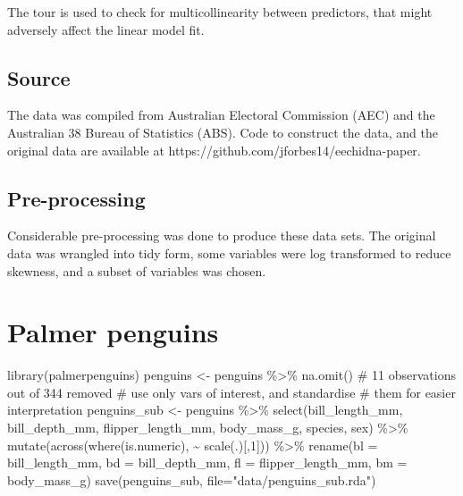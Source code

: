 \documentclass[
  letterpaper,
]{krantz}
\newenvironment{Shaded}{\begin{snugshade}}{\end{snugshade}}
\newcommand{\AttributeTok}[1]{\textcolor[rgb]{0.40,0.45,0.13}{#1}}
\newcommand{\CommentTok}[1]{\textcolor[rgb]{0.37,0.37,0.37}{#1}}
\newcommand{\DecValTok}[1]{\textcolor[rgb]{0.68,0.00,0.00}{#1}}
\newcommand{\FunctionTok}[1]{\textcolor[rgb]{0.28,0.35,0.67}{#1}}
\newcommand{\NormalTok}[1]{\textcolor[rgb]{0.00,0.23,0.31}{#1}}
\newcommand{\OtherTok}[1]{\textcolor[rgb]{0.00,0.23,0.31}{#1}}
\newcommand{\SpecialCharTok}[1]{\textcolor[rgb]{0.37,0.37,0.37}{#1}}
\newcommand{\StringTok}[1]{\textcolor[rgb]{0.13,0.47,0.30}{#1}}
\begin{document}
The tour is used to check for multicollinearity between predictors, that
might adversely affect the linear model fit.

\subsection*{Source}\label{source-2}

The data was compiled from Australian Electoral Commission (AEC) and the
Australian 38 Bureau of Statistics (ABS). Code to construct the data,
and the original data are available at
https://github.com/jforbes14/eechidna-paper.

\subsection*{Pre-processing}\label{pre-processing-2}

Considerable pre-processing was done to produce these data sets. The
original data was wrangled into tidy form, some variables were log
transformed to reduce skewness, and a subset of variables was chosen.

\section{Palmer penguins}\label{palmer-penguins}

\begin{Shaded}
\begin{Highlighting}[]
\FunctionTok{library}\NormalTok{(palmerpenguins)}
\NormalTok{penguins }\OtherTok{\textless{}{-}}\NormalTok{ penguins }\SpecialCharTok{\%\textgreater{}\%}
  \FunctionTok{na.omit}\NormalTok{() }\CommentTok{\# 11 observations out of 344 removed}
\CommentTok{\# use only vars of interest, and standardise}
\CommentTok{\# them for easier interpretation}
\NormalTok{penguins\_sub }\OtherTok{\textless{}{-}}\NormalTok{ penguins }\SpecialCharTok{\%\textgreater{}\%} 
  \FunctionTok{select}\NormalTok{(bill\_length\_mm,}
\NormalTok{         bill\_depth\_mm,}
\NormalTok{         flipper\_length\_mm,}
\NormalTok{         body\_mass\_g,}
\NormalTok{         species, }
\NormalTok{         sex) }\SpecialCharTok{\%\textgreater{}\%} 
  \FunctionTok{mutate}\NormalTok{(}\FunctionTok{across}\NormalTok{(}\FunctionTok{where}\NormalTok{(is.numeric),  }\SpecialCharTok{\textasciitilde{}} \FunctionTok{scale}\NormalTok{(.)[,}\DecValTok{1}\NormalTok{])) }\SpecialCharTok{\%\textgreater{}\%}
  \FunctionTok{rename}\NormalTok{(}\AttributeTok{bl =}\NormalTok{ bill\_length\_mm,}
         \AttributeTok{bd =}\NormalTok{ bill\_depth\_mm,}
         \AttributeTok{fl =}\NormalTok{ flipper\_length\_mm,}
         \AttributeTok{bm =}\NormalTok{ body\_mass\_g)}
\FunctionTok{save}\NormalTok{(penguins\_sub, }\AttributeTok{file=}\StringTok{"data/penguins\_sub.rda"}\NormalTok{)}
\end{Highlighting}
\end{Shaded}
\end{document}
